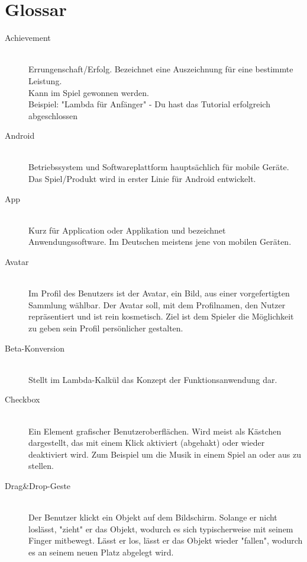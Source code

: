 \section{Glossar}

\begin{description}
	\item[Achievement] \hfill \\
	Errungenschaft/Erfolg. Bezeichnet eine Auszeichnung für eine bestimmte Leistung.\\
	Kann im Spiel gewonnen werden.\\
	Beispiel: "Lambda für Anfänger" - Du hast das Tutorial erfolgreich abgeschlossen\\
	
	\item[Android] \hfill \\
	Betriebssystem und Softwareplattform hauptsächlich für mobile Geräte. Das Spiel/Produkt wird in erster Linie 
	für Android entwickelt.
	
	\item[App] \hfill \\
	Kurz für Application oder Applikation und bezeichnet Anwendungssoftware. Im Deutschen meistens jene von mobilen Geräten.
	
	\item[Avatar] \hfill \\
	Im Profil des Benutzers ist der Avatar, ein Bild, aus einer vorgefertigten Sammlung wählbar.
	Der Avatar soll, mit dem Profilnamen, den Nutzer repräsentiert und ist rein kosmetisch.
	Ziel ist dem Spieler die Möglichkeit zu geben sein Profil persönlicher gestalten.
	
	\item[Beta-Konversion] \hfill \\
	Stellt im Lambda-Kalkül das Konzept der Funktionsanwendung dar.
	
	\item[Checkbox] \hfill \\
	Ein Element grafischer Benutzeroberflächen. Wird meist als Kästchen dargestellt, das mit einem Klick aktiviert (abgehakt) oder
	wieder deaktiviert wird. Zum Beispiel um die Musik in einem Spiel an oder aus zu stellen.
	
	\item[Drag\&Drop-Geste] \hfill \\
	Der Benutzer klickt ein Objekt auf dem Bildschirm. Solange er nicht loslässt, "zieht" er das Objekt, wodurch
	es sich typischerweise mit seinem Finger mitbewegt. Lässt er los, lässt er das Objekt wieder "fallen", wodurch
	es an seinem neuen Platz abgelegt wird.
	

\end{description}
